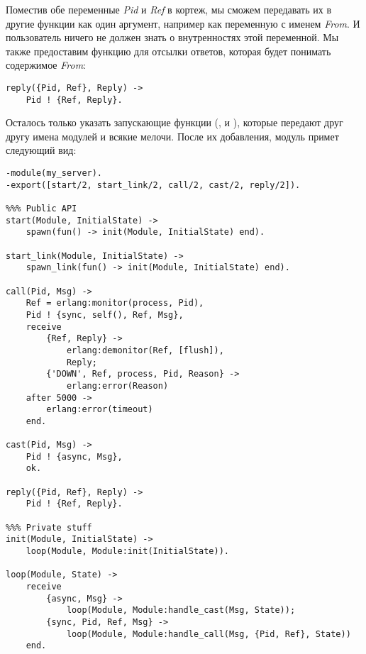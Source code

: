Поместив обе переменные \emph{Pid} и \emph{Ref} в кортеж, мы сможем передавать их в другие функции как один аргумент, например как переменную с именем \emph{From}.
И пользователь ничего не должен знать о внутренностях этой переменной.
Мы также предоставим функцию для отсылки ответов, которая будет понимать содержимое \emph{From}:
\begin{lstlisting}[style=erlang]
reply({Pid, Ref}, Reply) ->
    Pid ! {Ref, Reply}.
\end{lstlisting}

Осталось только указать запускающие функции (,  и ), которые передают друг другу имена модулей и всякие мелочи.
После их добавления, модуль примет следующий вид:
\begin{lstlisting}[style=erlang]
-module(my_server).
-export([start/2, start_link/2, call/2, cast/2, reply/2]).
 
%%% Public API
start(Module, InitialState) ->
    spawn(fun() -> init(Module, InitialState) end).
 
start_link(Module, InitialState) ->
    spawn_link(fun() -> init(Module, InitialState) end).
 
call(Pid, Msg) ->
    Ref = erlang:monitor(process, Pid),
    Pid ! {sync, self(), Ref, Msg},
    receive
        {Ref, Reply} ->
            erlang:demonitor(Ref, [flush]),
            Reply;
        {'DOWN', Ref, process, Pid, Reason} ->
            erlang:error(Reason)
    after 5000 ->
        erlang:error(timeout)
    end.
 
cast(Pid, Msg) ->
    Pid ! {async, Msg},
    ok.
 
reply({Pid, Ref}, Reply) ->
    Pid ! {Ref, Reply}.
 
%%% Private stuff
init(Module, InitialState) ->
    loop(Module, Module:init(InitialState)).
 
loop(Module, State) ->
    receive
        {async, Msg} ->
            loop(Module, Module:handle_cast(Msg, State));
        {sync, Pid, Ref, Msg} ->
            loop(Module, Module:handle_call(Msg, {Pid, Ref}, State))
    end.
\end{lstlisting}

